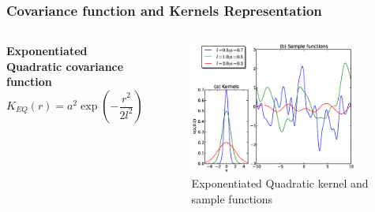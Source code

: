 \documentclass{beamer}
\begin{document}
\begin{frame}
\frametitle{Covariance function and Kernels Representation}

\begin{columns}[c] 
\textbf{Exponentiated Quadratic covariance function}
\begin{equation} \label{eq:EQ_cov}
K_{EQ}(r)= a^2 \exp \left(-\frac{r^2}{2l^2}\right)
\end{equation}
\begin{figure}[t]
	\centering
		\includegraphics[width=0.9\textwidth,keepaspectratio]{diagrams/SE_cov.eps}
	\caption[Exponentiated Quadratic kernel and sample functions]
		{Exponentiated Quadratic kernel and sample functions}
	\label{fig:Exponentiated_Quadratic_covariance}
\end{figure}


\end{columns}
\end{frame}
\end{document}
